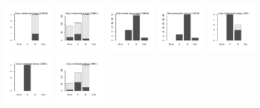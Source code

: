 \documentclass[10pt,article]{memoir}
\begin{document}
\begin{figure}[h!]
\includegraphics[width=0.19\textwidth]{figures/validation_plots/cckar_0p9_valplot.pdf}
\includegraphics[width=0.19\textwidth]{figures/validation_plots/chrm1_0p9_valplot.pdf}
\includegraphics[width=0.19\textwidth]{figures/validation_plots/chrm2_0p9_valplot.pdf}
\includegraphics[width=0.19\textwidth]{figures/validation_plots/chrm3_0p9_valplot.pdf}
\includegraphics[width=0.19\textwidth]{figures/validation_plots/cnr1_0p9_valplot.pdf}
\includegraphics[width=0.19\textwidth]{figures/validation_plots/cnr2_0p9_valplot.pdf}
\includegraphics[width=0.19\textwidth]{figures/validation_plots/drd1_0p9_valplot.pdf}

\end{figure}
\end{document}

